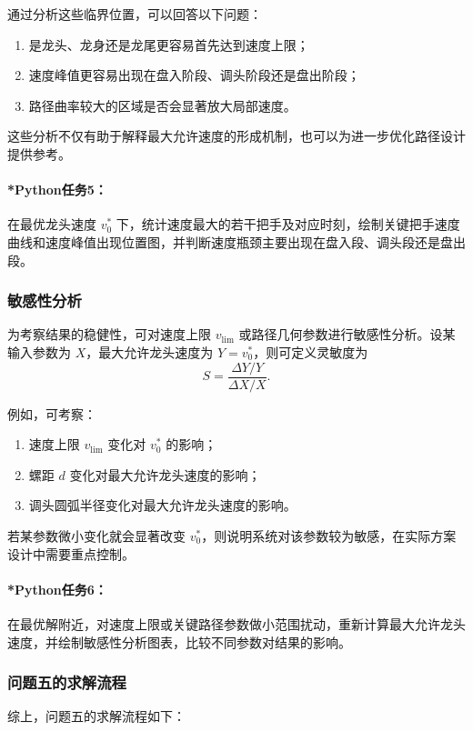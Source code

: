 \documentclass[12pt,a4paper]{ctexart}
\begin{document}
通过分析这些临界位置，可以回答以下问题：

\begin{enumerate}
    \item 是龙头、龙身还是龙尾更容易首先达到速度上限；
    \item 速度峰值更容易出现在盘入阶段、调头阶段还是盘出阶段；
    \item 路径曲率较大的区域是否会显著放大局部速度。
\end{enumerate}

这些分析不仅有助于解释最大允许速度的形成机制，也可以为进一步优化路径设计提供参考。

\paragraph{*Python任务5：}
在最优龙头速度 $v_0^\ast$ 下，统计速度最大的若干把手及对应时刻，绘制关键把手速度曲线和速度峰值出现位置图，并判断速度瓶颈主要出现在盘入段、调头段还是盘出段。

\subsubsection{敏感性分析}
为考察结果的稳健性，可对速度上限 $v_{\mathrm{lim}}$ 或路径几何参数进行敏感性分析。设某输入参数为 $X$，最大允许龙头速度为 $Y=v_0^\ast$，则可定义灵敏度为
\begin{equation}
S=\frac{\Delta Y / Y}{\Delta X / X}.
\end{equation}

例如，可考察：

\begin{enumerate}
    \item 速度上限 $v_{\mathrm{lim}}$ 变化对 $v_0^\ast$ 的影响；
    \item 螺距 $d$ 变化对最大允许龙头速度的影响；
    \item 调头圆弧半径变化对最大允许龙头速度的影响。
\end{enumerate}

若某参数微小变化就会显著改变 $v_0^\ast$，则说明系统对该参数较为敏感，在实际方案设计中需要重点控制。

\paragraph{*Python任务6：}
在最优解附近，对速度上限或关键路径参数做小范围扰动，重新计算最大允许龙头速度，并绘制敏感性分析图表，比较不同参数对结果的影响。

\subsubsection{问题五的求解流程}
综上，问题五的求解流程如下：
\end{document}
